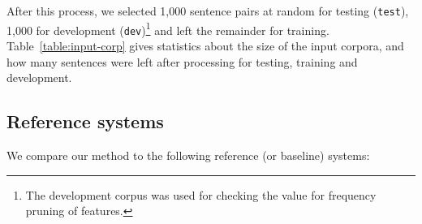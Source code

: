 \documentclass[11pt]{article}
\begin{document}
After this process, we selected 1,000 sentence pairs at random for
testing (\texttt{test}), 1,000 for development (\texttt{dev})\footnote{The development corpus  
  was used for checking the value for frequency pruning of features.} and 
left the remainder for training. 
Table~\ref{table:input-corp}
gives statistics about the size of the input corpora, and how many
sentences were left after processing for testing, training and
development. %

\subsection{Reference systems}

We compare our method to the following reference (or baseline) systems:
\end{document}
